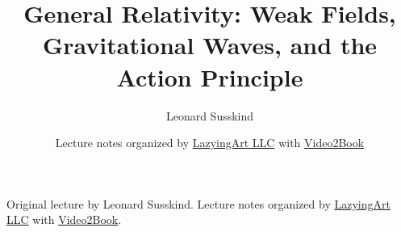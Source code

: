 \documentclass[11pt,oneside]{book}
\begin{document}
\frontmatter
\hypersetup{pageanchor=false}
\title{General Relativity: Weak Fields, Gravitational Waves, and the Action Principle}
\author{Leonard Susskind}
\date{Lecture notes organized by \href{https://lazying.art}{LazyingArt LLC} with \href{https://github.com/lachlanchen/Video2Book}{Video2Book}}
\maketitle
\begin{center}
\small Original lecture by Leonard Susskind. Lecture notes organized by \href{https://lazying.art}{LazyingArt LLC} with \href{https://github.com/lachlanchen/Video2Book}{Video2Book}.
\end{center}
\clearpage
\hypersetup{pageanchor=true}
\mainmatter

\end{document}
